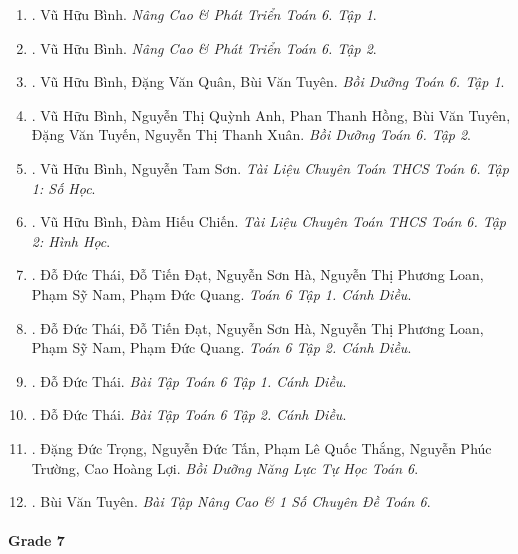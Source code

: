 \documentclass{article}
\begin{document}
\begin{enumerate}
	\item \cite{Binh_Toan_6_tap_1}. {\sc Vũ Hữu Bình}. {\it Nâng Cao \& Phát Triển Toán 6. Tập 1}.\hfill{\sf[done]}
	\item \cite{Binh_Toan_6_tap_2}. {\sc Vũ Hữu Bình}. {\it Nâng Cao \& Phát Triển Toán 6. Tập 2}.\hfill{\sf[done]}
	\item \cite{Binh_boi_duong_Toan_6_tap_1}. {\sc Vũ Hữu Bình, Đặng Văn Quân, Bùi Văn Tuyên}. {\it Bồi Dưỡng Toán 6. Tập 1}.\hfill{\sf[done]}
	\item \cite{Binh_boi_duong_Toan_6_tap_2}. {\sc Vũ Hữu Bình, Nguyễn Thị Quỳnh Anh, Phan Thanh Hồng, Bùi Văn Tuyên, Đặng Văn Tuyến, Nguyễn Thị Thanh Xuân}. {\it Bồi Dưỡng Toán 6. Tập 2}.\hfill{\sf[done]}
	\item \cite{TLCT_THCS_Toan_6_so_hoc}. {\sc Vũ Hữu Bình, Nguyễn Tam Sơn}. {\it Tài Liệu Chuyên Toán THCS Toán 6. Tập 1: Số Học}.\hfill{\sf[done]}
	\item \cite{TLCT_THCS_Toan_6_hinh_hoc}. {\sc Vũ Hữu Bình, Đàm Hiếu Chiến}. {\it Tài Liệu Chuyên Toán THCS Toán 6. Tập 2: Hình Học}.\hfill{\sf[done]}
	\item \cite{SGK_Toan_6_Canh_Dieu_tap_1}. {\sc Đỗ Đức Thái, Đỗ Tiến Đạt, Nguyễn Sơn Hà, Nguyễn Thị Phương Loan, Phạm Sỹ Nam, Phạm Đức Quang}. {\it Toán 6 Tập 1. Cánh Diều}.\hfill{\sf[done]}
	\item \cite{SGK_Toan_6_Canh_Dieu_tap_2}. {\sc Đỗ Đức Thái, Đỗ Tiến Đạt, Nguyễn Sơn Hà, Nguyễn Thị Phương Loan, Phạm Sỹ Nam, Phạm Đức Quang}. {\it Toán 6 Tập 2. Cánh Diều}.\hfill{\sf[done]}
	\item \cite{SBT_Toan_6_Canh_Dieu_tap_1}. {\sc Đỗ Đức Thái}. {\it Bài Tập Toán 6 Tập 1. Cánh Diều}.\hfill{\sf[done]}
	\item \cite{SBT_Toan_6_Canh_Dieu_tap_2}. {\sc Đỗ Đức Thái}. {\it Bài Tập Toán 6 Tập 2. Cánh Diều}.\hfill{\sf[done]}
	\item \cite{Trong_Toan_6}. {\sc Đặng Đức Trọng, Nguyễn Đức Tấn, Phạm Lê Quốc Thắng, Nguyễn Phúc Trường, Cao Hoàng Lợi}. {\it Bồi Dưỡng Năng Lực Tự Học Toán 6}.\hfill{\sf[reading]}
	\item \cite{Tuyen_Toan_6}. {\sc Bùi Văn Tuyên}. {\it Bài Tập Nâng Cao \& 1 Số Chuyên Đề Toán 6}.\hfill{\sf[done]}
\end{enumerate}

\paragraph{Grade 7}
\end{document}
